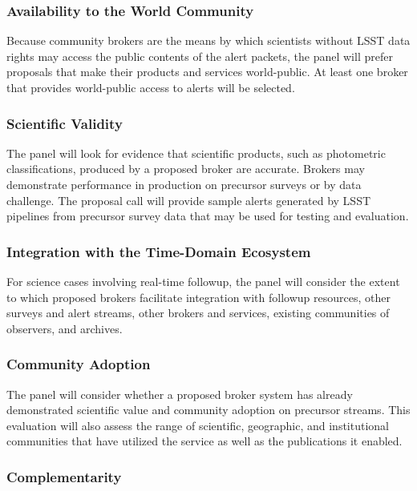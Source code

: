 \subsubsection{Availability to the World Community}

Because community brokers are the means by which scientists without LSST data rights may access the public contents of the alert packets, the panel will prefer proposals that make their products and services world-public.
At least one broker that provides world-public access to alerts will be selected.

\subsubsection{Scientific Validity}

The panel will look for evidence that scientific products, such as photometric classifications, produced by a proposed broker are accurate.
Brokers may demonstrate performance in production on precursor surveys or by data challenge.
The proposal call will provide sample alerts generated by LSST pipelines from precursor survey data that may be used for testing and evaluation.

\subsubsection{Integration with the Time-Domain Ecosystem}

For science cases involving real-time followup, the panel will consider the extent to which proposed brokers facilitate integration with followup resources, other surveys and alert streams, other brokers and services, existing communities of observers, and archives.


\subsubsection{Community Adoption}

The panel will consider whether a proposed broker system has already demonstrated scientific value and community adoption on precursor streams.
This evaluation will also assess the
range of scientific, geographic, and institutional communities that have utilized the service as well as the publications it enabled.


\subsubsection{Complementarity}

